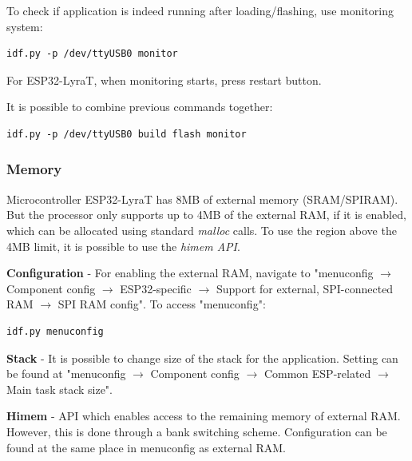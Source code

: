 \documentclass[thesis=M,english]{FITthesis}[2019/12/23]
\begin{document}
\bigskip
\noindent
To check if application is indeed running after loading/flashing, use monitoring system:
\begin{lstlisting}[frame=single]
idf.py -p /dev/ttyUSB0 monitor
\end{lstlisting}
For ESP32-LyraT, when monitoring starts, press restart button.

\bigskip
\noindent
It is possible to combine previous commands together:
\begin{lstlisting}[frame=single]
idf.py -p /dev/ttyUSB0 build flash monitor
\end{lstlisting}

\subsubsection{Memory} \label{esp-memory}
Microcontroller ESP32-LyraT has 8MB of external memory (SRAM/SPIRAM). But the processor only supports up to 4MB of the external RAM, if it is enabled, which can be allocated using standard \textit{malloc} calls. To use the region above the 4MB limit, it is possible to use the \textit{himem API}.

\bigskip
\noindent
\textbf{Configuration} - For enabling the external RAM, navigate to "menuconfig $\rightarrow$ Component config $\rightarrow$ ESP32-specific $\rightarrow$ Support for external, SPI-connected RAM $\rightarrow$ SPI RAM config". To access "menuconfig":
\begin{lstlisting}[frame=single]
idf.py menuconfig
\end{lstlisting}

\bigskip
\noindent
\textbf{Stack} - It is possible to change size of the stack for the application. Setting can be found at "menuconfig $\rightarrow$ Component config $\rightarrow$ Common ESP-related $\rightarrow$ Main task stack size".

\bigskip
\noindent
\textbf{Himem} - API which enables access to the remaining memory of external RAM. However, this is done through a bank switching scheme. Configuration can be found at the same place in menuconfig as external RAM.

\end{document}
